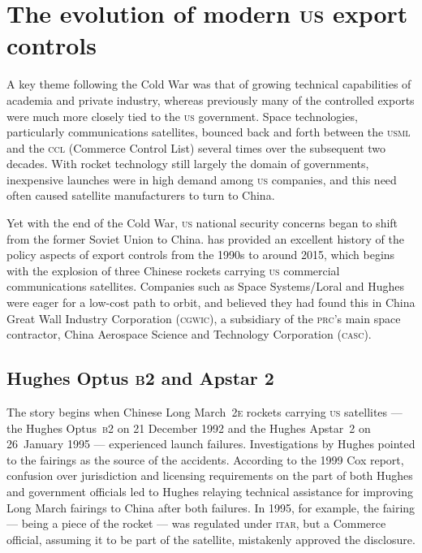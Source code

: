 \documentclass[preprint,twocolumn,5p]{elsarticle}
\begin{document}
\section{The evolution of modern \textsc{us} export controls}
A key theme following the Cold War was that of growing technical capabilities of academia and private industry, whereas previously many of the controlled exports were much more closely tied to the \textsc{us} government. Space technologies, particularly communications satellites, bounced back and forth between the \textsc{usml} and the \textsc{ccl} (Commerce Control List) several times over the subsequent two decades. With rocket technology still largely the domain of governments, inexpensive launches were in high demand among \textsc{us} companies, and this need often caused satellite manufacturers to turn to China.

Yet with the end of the Cold War, \textsc{us} national security concerns began to shift from the former Soviet Union to China. \citet{Zinger2015} has provided an excellent history of the policy aspects of export controls from the 1990s to around 2015, which begins with the explosion of three Chinese rockets carrying \textsc{us} commercial communications satellites. Companies such as Space Systems/Loral and Hughes were eager for a low-cost path to orbit, and believed they had found this in China Great Wall Industry Corporation (\textsc{cgwic}), a subsidiary of the \textsc{prc}'s main space contractor, China Aerospace Science and Technology Corporation (\textsc{casc}).

\subsection{Hughes Optus \textsc{b2} and Apstar 2}
The story begins when Chinese Long March~\textsc{2e} rockets carrying \textsc{us} satellites --- the Hughes Optus~\textsc{b2} on 21 December 1992 and the Hughes Apstar~2 on 26~January 1995 --- experienced launch failures. Investigations by Hughes pointed to the fairings as the source of the accidents. According to the 1999 Cox report, confusion over jurisdiction and licensing requirements on the part of both Hughes and government officials led to Hughes relaying technical assistance for improving Long March fairings to China after both failures. In 1995, for example, the fairing --- being a piece of the rocket --- was regulated under \textsc{itar}, but a Commerce official, assuming it to be part of the satellite, mistakenly approved the disclosure. \citep{Cox1999} %
\end{document}

